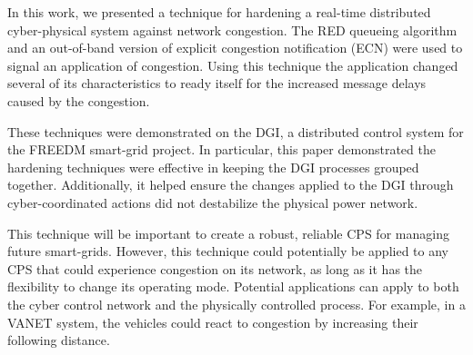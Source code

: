 In this work, we presented a technique for hardening a real-time distributed cyber-physical system against network congestion.
The \ac{RED} queueing algorithm and an out-of-band version of explicit congestion notification (ECN) were used to signal an application of congestion.
Using this technique the application changed several of its characteristics to ready itself for the increased message delays caused by the congestion.

These techniques were demonstrated on the \ac{DGI}, a distributed control system for the \ac{FREEDM} smart-grid project.
In particular, this paper demonstrated the hardening techniques were effective in keeping the \ac{DGI} processes grouped together.
Additionally, it helped ensure the changes applied to the \ac{DGI} through cyber-coordinated actions did not destabilize the physical power network.

This technique will be important to create a robust, reliable \ac{CPS} for managing future smart-grids.
However, this technique could potentially be applied to any \ac{CPS} that could experience congestion on its network, as long as it has the flexibility to change its operating mode.
Potential applications can apply to both the cyber control network and the physically controlled process.
For example, in a \ac{VANET} system, the vehicles could react to congestion by increasing their following distance.
